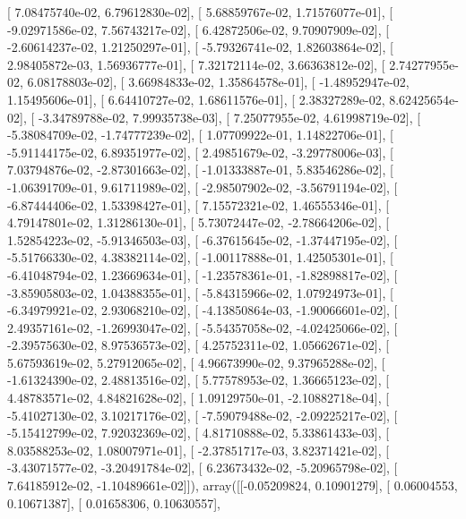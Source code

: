 \documentclass{article}
\begin{document}
       [  7.08475740e-02,   6.79612830e-02],
       [  5.68859767e-02,   1.71576077e-01],
       [ -9.02971586e-02,   7.56743217e-02],
       [  6.42872506e-02,   9.70907909e-02],
       [ -2.60614237e-02,   1.21250297e-01],
       [ -5.79326741e-02,   1.82603864e-02],
       [  2.98405872e-03,   1.56936777e-01],
       [  7.32172114e-02,   3.66363812e-02],
       [  2.74277955e-02,   6.08178803e-02],
       [  3.66984833e-02,   1.35864578e-01],
       [ -1.48952947e-02,   1.15495606e-01],
       [  6.64410727e-02,   1.68611576e-01],
       [  2.38327289e-02,   8.62425654e-02],
       [ -3.34789788e-02,   7.99935738e-03],
       [  7.25077955e-02,   4.61998719e-02],
       [ -5.38084709e-02,  -1.74777239e-02],
       [  1.07709922e-01,   1.14822706e-01],
       [ -5.91144175e-02,   6.89351977e-02],
       [  2.49851679e-02,  -3.29778006e-03],
       [  7.03794876e-02,  -2.87301663e-02],
       [ -1.01333887e-01,   5.83546286e-02],
       [ -1.06391709e-01,   9.61711989e-02],
       [ -2.98507902e-02,  -3.56791194e-02],
       [ -6.87444406e-02,   1.53398427e-01],
       [  7.15572321e-02,   1.46555346e-01],
       [  4.79147801e-02,   1.31286130e-01],
       [  5.73072447e-02,  -2.78664206e-02],
       [  1.52854223e-02,  -5.91346503e-03],
       [ -6.37615645e-02,  -1.37447195e-02],
       [ -5.51766330e-02,   4.38382114e-02],
       [ -1.00117888e-01,   1.42505301e-01],
       [ -6.41048794e-02,   1.23669634e-01],
       [ -1.23578361e-01,  -1.82898817e-02],
       [ -3.85905803e-02,   1.04388355e-01],
       [ -5.84315966e-02,   1.07924973e-01],
       [ -6.34979921e-02,   2.93068210e-02],
       [ -4.13850864e-03,  -1.90066601e-02],
       [  2.49357161e-02,  -1.26993047e-02],
       [ -5.54357058e-02,  -4.02425066e-02],
       [ -2.39575630e-02,   8.97536573e-02],
       [  4.25752311e-02,   1.05662671e-02],
       [  5.67593619e-02,   5.27912065e-02],
       [  4.96673990e-02,   9.37965288e-02],
       [ -1.61324390e-02,   2.48813516e-02],
       [  5.77578953e-02,   1.36665123e-02],
       [  4.48783571e-02,   4.84821628e-02],
       [  1.09129750e-01,  -2.10882718e-04],
       [ -5.41027130e-02,   3.10217176e-02],
       [ -7.59079488e-02,  -2.09225217e-02],
       [ -5.15412799e-02,   7.92032369e-02],
       [  4.81710888e-02,   5.33861433e-03],
       [  8.03588253e-02,   1.08007971e-01],
       [ -2.37851717e-03,   3.82371421e-02],
       [ -3.43071577e-02,  -3.20491784e-02],
       [  6.23673432e-02,  -5.20965798e-02],
       [  7.64185912e-02,  -1.10489661e-02]]), array([[-0.05209824,  0.10901279],
       [ 0.06004553,  0.10671387],
       [ 0.01658306,  0.10630557],
\end{document}
